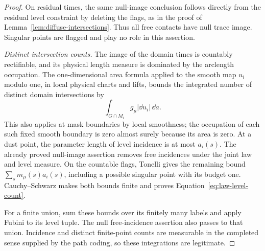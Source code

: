 \begin{proof}
On residual times, the same null-image conclusion follows directly
from the residual level constraint by deleting the flags, as in the
proof of Lemma~\ref{lem:diffuse-intersections}.  Thus all free contacts
have null trace image.  Singular points are flagged and play no role
in this assertion.

\emph{Distinct intersection counts.}
The image of the domain times is countably rectifiable, and its
physical length measure is dominated by the arclength occupation.
The one-dimensional area formula applied to the smooth map $u_i$
modulo one, in local physical charts and lifts, bounds the integrated
number of distinct domain intersections by
\[
 \int_{G\cap M_i}g_\mu|\dd u_i|\,\dd a.
\]
This also applies at mask boundaries by local smoothness; the
occupation of each such fixed smooth boundary is zero almost surely
because its area is zero.  At a dust point, the parameter length of
level incidence is at most $a_i(s)$.  The already proved null-image
assertion removes free incidences under the joint law and level
measure.  On the countable flags, Tonelli gives the remaining bound
$\sum_s m_\mu(s)a_i(s)$, including a possible singular point with its
budget one.  Cauchy--Schwarz makes both bounds finite and proves
Equation~\eqref{eq:law-level-count}.

For a finite union, sum these bounds over its finitely many labels
and apply Fubini to its level tuple.  The null free-incidence assertion
also passes to that union.  Incidence and distinct finite-point counts
are measurable in the completed sense supplied by the path coding,
so these integrations are legitimate.
\end{proof}
